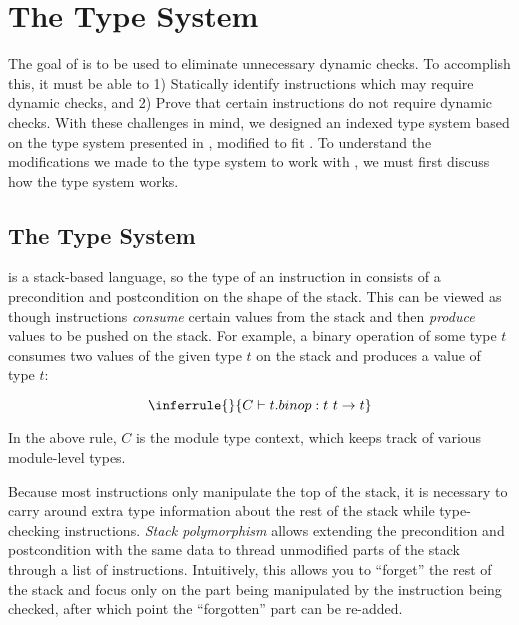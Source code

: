 \chapter{The \name Type System}
\label{chp:typesys}

The goal of \name is to be used to eliminate unnecessary dynamic checks.
To accomplish this, it must be able to 1) Statically identify instructions which may require dynamic checks, and 2) Prove that certain instructions do not require dynamic checks.
With these challenges in mind, we designed an indexed type system based on the type system presented in \dtal, modified to fit \wasm.
To understand the modifications we made to the \name type system to work with \wasm, we must first discuss how the \wasm type system works.




\section{The \wasm Type System}
\wasm is a stack-based language, so the type of an instruction in \wasm consists of a precondition and postcondition on the shape of the stack.
This can be viewed as though instructions \emph{consume} certain values from the stack and then \emph{produce} values to be pushed on the stack.
For example, a binary operation of some type $t$ consumes two values of the given type $t$ on the stack and produces a value of type $t$:

\[
    \inferrule{ }{C \vdash t.binop : t\ t \rightarrow t}
\]

In the above rule, $C$ is the module type context, which keeps track of various module-level types.

Because most instructions only manipulate the top of the stack, it is necessary to carry around extra type information about the rest of the stack while type-checking instructions.
\emph{Stack polymorphism} allows extending the precondition and postcondition with the same data to thread unmodified parts of the stack through a list of instructions.
Intuitively, this allows you to ``forget'' the rest of the stack and focus only on the part being manipulated by the instruction being checked, after which point the ``forgotten'' part can be re-added.

